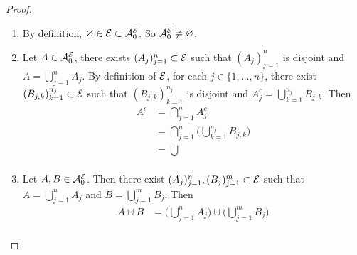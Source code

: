 \documentclass{book}
\begin{document}
	\begin{proof}\
		\begin{enumerate}
			\item By definition, $\varnothing \in \mathcal{E} \subset \mathcal{A}^{\mathcal{E}}_0$. So $\mathcal{A}^{\mathcal{E}}_0 \neq \varnothing$. 
			\item Let $A \in \mathcal{A}^{\mathcal{E}}_0$, there exists $(A_j)_{j=1}^n \subset \mathcal{E}$ such that $(A_j)_{j=1}^n$ is disjoint and $A = \bigcup\limits_{j =1}^n A_j$. By definition of $\mathcal{E}$, for each $j \in \{1, \ldots, n\}$, there exist $(B_{j,k})_{k=1}^{n_j} \subset \mathcal{E}$ such that $(B_{j,k})_{k=1}^{n_j}$ is disjoint and $A_j^c = \bigcup\limits_{k=1}^{n_j}B_{j,k}$. Then 
			\begin{align*}
				A^c 
				&= \bigcap_{j=1}^n A_j^c \\
				&= \bigcap_{j=1}^n \bigg( \bigcup\limits_{k=1}^{n_j}B_{j,k} \bigg)\\
				&= \bigcup\\
			\end{align*}	 
			\item Let $A, B \in \mathcal{A}^{\mathcal{E}}_0$. Then there exist $(A_j)_{j=1}^n, (B_j)_{j=1}^m \subset \mathcal{E}$ such that $A = \bigcup\limits_{j=1}^n A_j$ and  $B = \bigcup\limits_{j=1}^m B_j$. Then 
			\begin{align*}
				A \cup B 
				&=  \bigg( \bigcup\limits_{j=1}^n A_j \bigg) \cup \bigg( \bigcup\limits_{j=1}^m B_j \bigg) \\
			\end{align*}
		\end{enumerate}
	\end{proof}

	
	
	
	
	
	
	
	
	
	
	

	

	
\end{document}
